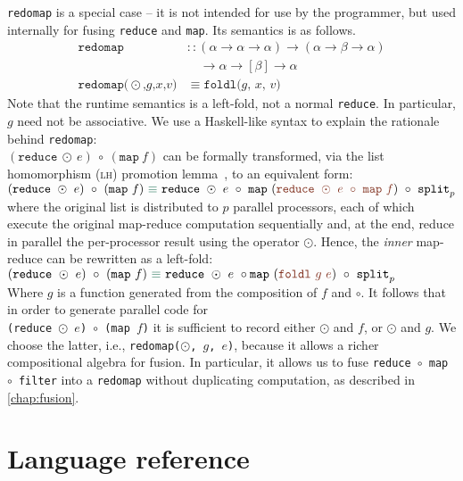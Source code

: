 \texttt{redomap} is a special case -- it is not intended for use by
the programmer, but used internally for fusing \texttt{reduce} and
\texttt{map}.  Its semantics is as follows.
\begin{align*}
\texttt{redomap}
& :: (\alpha\rightarrow\alpha\rightarrow\alpha)\rightarrow(\alpha\rightarrow\beta\rightarrow\alpha)\\
& \quad\rightarrow\alpha\rightarrow[\beta]\rightarrow\alpha \\
\texttt{redomap($\odot$,$g$,$x$,$v$)} & \equiv \texttt{foldl($g$, $x$, $v$)}
\end{align*}
Note that the runtime semantics is a left-fold, not a normal \LO{}
\texttt{reduce}.  In particular, $g$ need not be associative.  We use
a Haskell-like syntax to explain the
rationale behind \texttt{redomap}:\\
$(\texttt{reduce}\ \odot\ e)\ \circ\ (\texttt{map}\ f)$ can be
formally transformed, via the list homomorphism (\textsc{lh})
promotion lemma~\cite{BirdListTh}, to an
equivalent form:  \\
$(\texttt{reduce}\ \odot\ e)\ \circ\ (\texttt{map}\ f)\
\emphh{\equiv}\ \texttt{reduce}\ \odot\
e\ \circ\ \texttt{map}\ (\emp{\texttt{reduce}\ \odot\ e\ \circ\ \texttt{map}\ f})\ \circ\ \texttt{split}_{p}$\\
where the original list is distributed to $p$ parallel processors,
each of which execute the original map-reduce computation sequentially
and, at the end, reduce in parallel the per-processor result using the
operator $\odot$.  Hence, the \textit{inner} map-reduce can be
rewritten as a left-fold:\\
$(\texttt{reduce}\ \odot\ e)\ \circ\ (\texttt{map}\ f)\
\emphh{\equiv}\ \texttt{reduce}\ \odot\
e\ \circ \texttt{map} \ (\emp{\texttt{foldl}\ g\ e})\ \circ\ \texttt{split}_{p}$\\
Where $g$ is a function generated from the composition of $f$ and
$\circ$.  It follows that in order to generate parallel code for \\
\texttt{(reduce $\odot$ $e$) $\circ$ (map $f$)} it is sufficient to
record either $\odot$ and $f$, or $\odot$ and $g$. We choose the
latter, i.e., \texttt{redomap($\odot$, $g$, $e$)}, because it allows a
richer compositional algebra for fusion.  In particular, it allows us
to fuse \texttt{reduce~$\circ$~map~$\circ$~filter} into a
\texttt{redomap} without duplicating computation, as described in
\cref{chap:fusion}.

\section{Language reference}
\label{sec:l0-reference}

